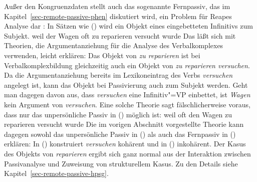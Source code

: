 {Außer den Kongruenzdaten stellt auch das sogenannte Fernpassiv, das im Kapitel~\ref{sec-remote-passive-phen}
diskutiert wird, ein Problem für Reapes Analyse dar \citep[Abschnitt~5.2]{Kathol98b}: In
Sätzen wie () wird ein Objekt eines eingebetteten Infinitivs zum Subjekt.
\ea
weil der Wagen oft zu reparieren versucht wurde
\z
Das läßt sich mit Theorien, die Argumentanziehung für die Analyse des Verbalkomplexes verwenden,
leicht erklären: Das Objekt von \emph{zu reparieren} ist bei Verbalkomplexbildung gleichzeitig
auch ein Objekt von \emph{zu reparieren versuchen}. Da die Argumentanziehung bereits im Lexikoneintrag
des Verbs \emph{versuchen} angelegt ist, kann das Objekt bei Passivierung auch zum Subjekt werden.
Geht man dagegen davon aus, dass \emph{versuchen} eine Infinitiv"=VP einbettet, ist \emph{Wagen}
kein Argument von \emph{versuchen}. Eine solche Theorie sagt fälschlicherweise voraus, dass nur das unpersönliche
Passiv in () möglich ist:
\ea
weil oft den Wagen zu reparieren versucht wurde
\z
Die im vorigen Abschnitt vorgestellte Theorie kann dagegen sowohl das unpersönliche Passiv
in () als auch das Fernpassiv in () erklären: In () konstruiert
\emph{versuchen} kohärent und in () inkohärent. Der Kasus des Objekts von \emph{reparieren}
ergibt sich ganz normal aus der Interaktion zwischen Passivanalyse und Zuweisung von strukturellem
Kasus. Zu den Details siehe Kapitel~\ref{sec-remote-passive-hpsg}.%



\begin{comment}
\subsection{Lexicalized Tree Adjoining Grammar und die Kompetenz/""Performanz"=Unterscheidung}

In der formalen Grammatiktheorie wird erforscht, welcher Komplexitätsklasse Grammatiken
angehören müssen, um natürliche Sprache adäquat beschreiben zu können. \citet{Chomsky56a-u} hat vier
Klassen definiert: die regulären Grammatiken, die kontextfreien Grammatiken, die kontextsensitiven
und die unrestringierten Grammatiken. Man ist sich inzwischen einig, dass kontextfreie Grammatiken
zwar große Ausschnitte von natürlichen Sprachen beschrieben können, aber nicht allen Phänomene in
allen Sprachen eine Analyse zuordnen können. Man ist sich relativ sicher, dass die natürlichen
Sprachen einer Teilklasse der kontextsensitiven Sprachen entsprechen. Eine solche Teilklasse sind
zum Beispiel die \emph{Mildly Context Sensitive Grammars}.


\end{comment}}
